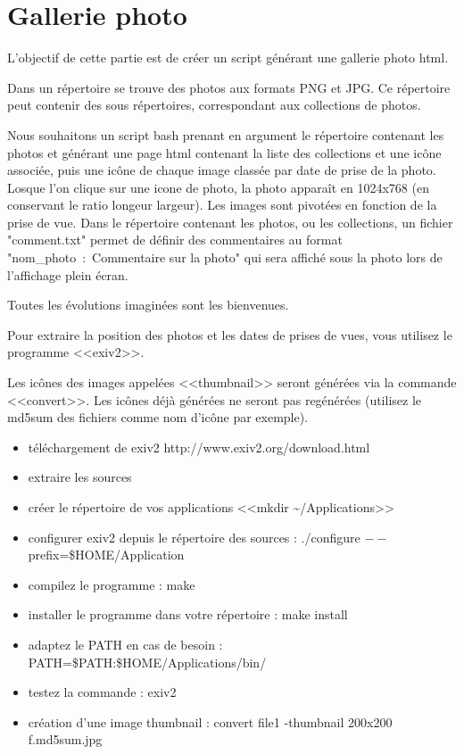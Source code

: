 \documentclass[11pt]{article}
\begin{document}
\section{Gallerie photo}

L'objectif de cette partie est de créer un script générant une gallerie photo html. 

Dans un répertoire se trouve des photos aux formats PNG et JPG. Ce répertoire peut contenir des sous répertoires, correspondant aux collections de photos.

Nous souhaitons un script bash prenant en argument le répertoire contenant les photos et générant une page html contenant la liste des collections et une icône associée, puis une icône de chaque image classée par date de prise de la photo. Losque l'on clique sur une icone de photo, la photo apparaît en 1024x768 (en conservant le ratio longeur largeur). Les images sont pivotées en fonction de la prise de vue. Dans le répertoire contenant les photos, ou les collections, un fichier "comment.txt" permet de définir des commentaires au format "nom\_photo~:~Commentaire sur la photo" qui sera affiché sous la photo lors de l'affichage plein écran.

Toutes les évolutions imaginées sont les bienvenues.

Pour extraire la position des photos et les dates de prises de vues, vous utilisez le programme <<exiv2>>.

Les icônes des images appelées <<thumbnail>> seront générées via la commande <<convert>>. Les icônes déjà générées ne seront pas regénérées (utilisez le md5sum des fichiers comme nom d'icône par exemple).

\begin{solution}
\begin{itemize}
 \item téléchargement de exiv2 http://www.exiv2.org/download.html
 \item extraire les sources
 \item créer le répertoire de vos applications <<mkdir \textasciitilde{}/Applications>>
 \item configurer exiv2 depuis le répertoire des sources : ./configure $--$prefix=\$HOME/Application
 \item compilez le programme : make
 \item installer le programme dans votre répertoire : make install
 \item adaptez le PATH en cas de besoin : PATH=\$PATH:\$HOME/Applications/bin/
 \item testez la commande : exiv2
 \item création d'une image thumbnail : convert file1 -thumbnail 200x200 f.md5sum.jpg
\end{itemize}
\end{solution}
\end{document}
